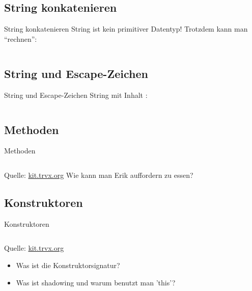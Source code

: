\documentclass[usepdftitle=false,hyperref={pdfpagelabels=false}]{beamer}
\begin{document}
\subsection{String konkatenieren}
\begin{frame}{String konkatenieren}
  String ist kein primitiver Datentyp! Trotzdem kann man "`rechnen"':
  \inputminted[linenos, numbersep=5pt, tabsize=4]{java}{String-02.java}
\end{frame}

\subsection{String und Escape-Zeichen}
\begin{frame}{String und Escape-Zeichen}
  String mit Inhalt :
  \inputminted[linenos, numbersep=5pt, tabsize=4]{java}{String-03.java}
  \vspace{6 mm}
  \vspace{6 mm}
\end{frame}

\subsection{Methoden}
\begin{frame}{Methoden}
    \inputminted[linenos, numbersep=5pt, tabsize=4, frame=lines, label=Shark.java, fontsize=\tiny]{java}{Shark.java}
    {\tiny Quelle: \href{http://kit.trvx.org/build/tutorial-02.html\#/7}{kit.trvx.org}}
    \newline
    \newline
    Wie kann man Erik auffordern zu essen?
\end{frame}

\subsection{Konstruktoren}
\begin{frame}{Konstruktoren}
    \inputminted[linenos, numbersep=5pt, tabsize=4, frame=lines, label=Shark.java, fontsize=\tiny]{java}{Shark-constructor.java}
    {\tiny Quelle: \href{http://kit.trvx.org/build/tutorial-02.html\#/8}{kit.trvx.org}}
    \newline
    \newline
    \begin{itemize}
        \item Was ist die Konstruktorsignatur?
        \item Was ist shadowing und warum benutzt man 'this'?
    \end{itemize}
\end{frame}
\end{document}
